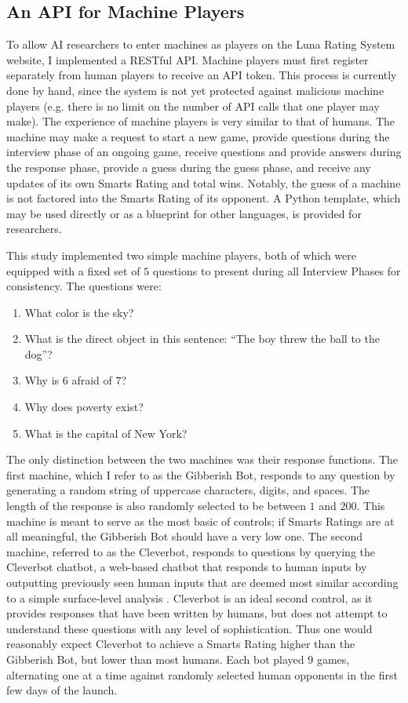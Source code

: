 \subsection{An API for Machine Players}

To allow AI researchers to enter machines as players on the Luna Rating System website, I implemented a RESTful API. Machine players must first register separately from human players to receive an API token. This process is currently done by hand, since the system is not yet protected against malicious machine players (e.g. there is no limit on the number of API calls that one player may make). The experience of machine players is very similar to that of humans. The machine may make a request to start a new game, provide questions during the interview phase of an ongoing game, receive questions and provide answers during the response phase, provide a guess during the guess phase, and receive any updates of its own Smarts Rating and total wins. Notably, the guess of a machine is not factored into the Smarts Rating of its opponent. A Python template, which may be used directly or as a blueprint for other languages, is provided for researchers. 


This study implemented two simple machine players, both of which were equipped with a fixed set of $5$ questions to present during all Interview Phases for consistency. The questions were:

\begin{enumerate}
\item What color is the sky?
\item What is the direct object in this sentence: ``The boy threw the ball to the dog''? 
\item Why is $6$ afraid of $7$?
\item Why does poverty exist?
\item What is the capital of New York?
\end{enumerate}

The only distinction between the two machines was their response functions. The first machine, which I refer to as the Gibberish Bot, responds to any question by generating a random string of uppercase characters, digits, and spaces. The length of the response is also randomly selected to be between $1$ and $200$. This machine is meant to serve as the most basic of controls; if Smarts Ratings are at all meaningful, the Gibberish Bot should have a very low one. The second machine, referred to as the Cleverbot, responds to questions by querying the Cleverbot chatbot, a web-based chatbot that responds to human inputs by outputting previously seen human inputs that are deemed most similar according to a simple surface-level analysis  \citep{carpenter2015cleverbot}. Cleverbot is an ideal second control, as it provides responses that have been written by humans, but does not attempt to understand these questions with any level of sophistication. Thus one would reasonably expect Cleverbot to achieve a Smarts Rating higher than the Gibberish Bot, but lower than most humans. Each bot played $9$ games, alternating one at a time against randomly selected human opponents in the first few days of the launch.

